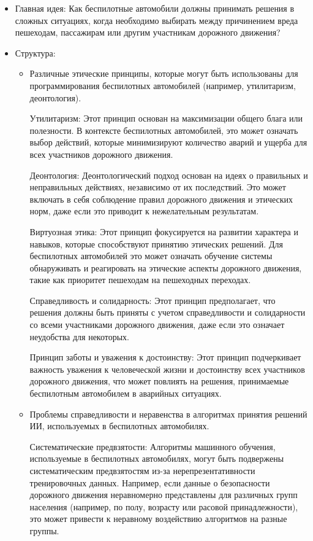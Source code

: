 \documentclass{article}
\begin{document}
\begin{itemize}
   \item Главная идея: Как беспилотные автомобили должны принимать решения в сложных ситуациях, когда необходимо выбирать между причинением вреда пешеходам, пассажирам или другим участникам дорожного движения?

   \item Структура:

   \begin{itemize}
        \item Различные этические принципы, которые могут быть использованы для программирования беспилотных автомобилей (например, утилитаризм, деонтология).

        Утилитаризм: Этот принцип основан на максимизации общего блага или полезности. В контексте беспилотных автомобилей, это может означать выбор действий, которые минимизируют количество аварий и ущерба для всех участников дорожного движения.

        Деонтология: Деонтологический подход основан на идеях о правильных и неправильных действиях, независимо от их последствий. Это может включать в себя соблюдение правил дорожного движения и этических норм, даже если это приводит к нежелательным результатам.

        Виртуозная этика: Этот принцип фокусируется на развитии характера и навыков, которые способствуют принятию этических решений. Для беспилотных автомобилей это может означать обучение системы обнаруживать и реагировать на этические аспекты дорожного движения, такие как приоритет пешеходам на пешеходных переходах.

        Справедливость и солидарность: Этот принцип предполагает, что решения должны быть приняты с учетом справедливости и солидарности со всеми участниками дорожного движения, даже если это означает неудобства для некоторых.

        Принцип заботы и уважения к достоинству: Этот принцип подчеркивает важность уважения к человеческой жизни и достоинству всех участников дорожного движения, что может повлиять на решения, принимаемые беспилотным автомобилем в аварийных ситуациях.
        
        \item Проблемы справедливости и неравенства в алгоритмах принятия решений ИИ, используемых в беспилотных автомобилях.

        Систематические предвзятости: Алгоритмы машинного обучения, используемые в беспилотных автомобилях, могут быть подвержены систематическим предвзятостям из-за нерепрезентативности тренировочных данных. Например, если данные о безопасности дорожного движения неравномерно представлены для различных групп населения (например, по полу, возрасту или расовой принадлежности), это может привести к неравному воздействию алгоритмов на разные группы.


\end{itemize}
\end{itemize}
\end{document}
